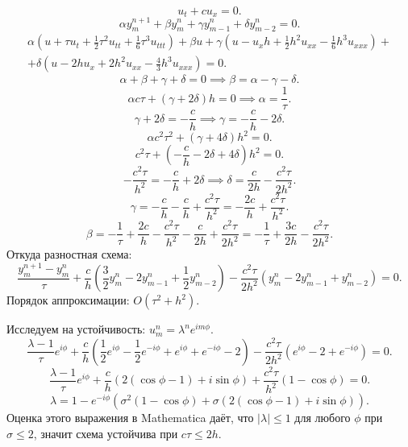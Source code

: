 \documentclass[a4paper]{article}
\begin{document}
\begin{hiProb}[7.3]
\end{hiProb}
\begin{sol}
\[
u_t+ c u_x=0
.\] 
\[
\alpha y_m^{n+1}+\beta y_m^n+\gamma
y_{m-1}^n+ \delta y_{m-2}^n=0
.\] 
\begin{multline*}
	\alpha\left( u + \tau u_t + \frac{1}{2}
	\tau^2 u_{t t}+ \frac{1}{6}\tau^3 u_{t t t}
\right)+ \beta u+ \gamma \left( 
u-u_x h+ \frac{1}{2} h^2 u_{x x} - \frac{1}{6} h^3 u_{x x x }\right) +\\+
\delta \left( u-2 h u_x +2 h^2 u_{x x}-
\frac{4}{3} h^3 u_{x x x}\right) =0
.\end{multline*} 
\[
\alpha+\beta+\gamma+\delta=0\implies\beta=
\alpha-\gamma-\delta
.\] 
\[
	\alpha c \tau + \left( \gamma+ 2\delta \right) h=0\implies \alpha= \frac{1}{\tau}
.\] 
\[
\gamma+2\delta= - \frac{c}{h}\implies \gamma=
-\frac{c}{h}-2\delta
.\] 
\[
	\alpha c^2 \tau^2 + (\gamma+4\delta)h^2=0
.\] 
\[
	c^2 \tau +\left( 
	-\frac{c}{h}-2\delta +4\delta\right) h^2=0
.\] 
\[
-\frac{c^2 \tau}{h^2}= -\frac{c}{h}+2\delta\implies
\delta= \frac{c}{2h}- \frac{c^2 \tau}{2 h^2}
.\] 
\[
\gamma= -\frac{c}{h}- \frac{c}{h}+
\frac{c^2 \tau}{h^2}= -\frac{2c}{h}+\frac{c^2\tau}{
h^2}
.\] 
\[
\beta= -\frac{1}{\tau}+ \frac{2c}{h}- \frac{c^2 \tau}{h^2}- \frac{c}{2h}+ \frac{c^2 \tau}{2h^2}
=-\frac{1}{\tau}+\frac{3c}{2h}- \frac{c^2 \tau}{2h^2}
.\] 
Откуда разностная схема:
\[
\frac{y_m^{n+1}-y_m^n}{\tau}+
\frac{c}{h} \left( \frac{3}{2} y_m^n-2 y_{m-1}^n+
\frac{1}{2}y_{m-2}^n\right) -
\frac{c^2 \tau}{2h^2} \left( y_m^n-2y_{m-1}^n
+ y_{m-2}^n\right) =0
.\] 
Порядок аппроксимации: $O\left(\tau^2+h^2\right)$.

Исследуем на устойчивость:  $u_m^n= \lambda^n e^{im\phi}$.
\[
	\frac{\lambda-1}{\tau}e^{i\phi}+\frac{c}{h}\left( 
	\frac{1}{2}e^{i\phi}- \frac{1}{2}e^{- i\phi}+e^{i\phi} +e^{-i\phi}-2\right) -
	\frac{c^2 \tau}{2h^2} \left( 
	e^{i\phi}-2+e^{-i\phi}\right) =0
.\] 
\[
\frac{\lambda-1}{\tau}e^{i\phi}+\frac{c}{h}
\left( 2\left( \cos \phi-1 \right) +i
\sin \phi\right) + \frac{c^2 \tau}{h^2}
(1- \cos \phi)=0
.\] 
\[
	\lambda= 1 -e ^{-i\phi} \left( \sigma^2(1-\cos  \phi)+ \sigma \left( 2 \left( \cos \phi-1 \right) +i \sin \phi \right)  \right) 
.\] 
Оценка этого выражения в Mathematica даёт, что
 $|\lambda|\le 1$ для любого $\phi$ при $\sigma\le 2$,
значит схема устойчива при $c\tau \le 2 h$.
\end{sol}
\begin{hiProb}[7.4]
\end{hiProb}
\end{document}
